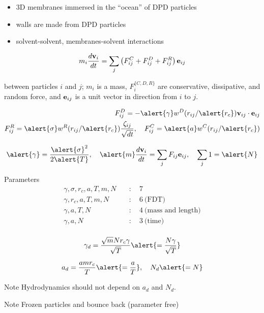 \begin{itemize}
  \item 3D membranes immersed in the ``ocean'' of DPD particles
  \item walls are made from DPD particles
  \item solvent-solvent, membranes-solvent interactions
\end{itemize}

\[
  m_i \frac{d \mathbf{v}_i}{dt} = \sum_{j}
  \left(
    F_{ij}^{C} + F_{ij}^{D} + F_{ij}^{R}
  \right) \mathbf{e}_{ij}{}
\]

between particles $i$ and $j$; $m_i$ is a mass, $F_{i}^{\{C,D,R\}}$
are conservative, dissipative, and random force, and $\mathbf{e}_{ij}{}$ is a unit
vector in direction from $i$ to $j$.
\eframe

\begin{align*}
  \label{eq:FD}
  F_{ij}^D = - \alert{\gamma} w^{D}(r_{ij}/\alert{r_{c}}) \mathbf{v}_{ij} \cdot \mathbf{e}_{ij} \\
  F_{ij}^R = \alert{\sigma} w^{R}(r_{ij}/\alert{r_{c}}) \frac{\zeta_{ij}}{\sqrt{dt}}, \quad
  F_{ij}^C = \alert{a} w^C(r_{ij}/\alert{r_{c}})
\end{align*}

\[
  \alert{\gamma} =\frac{\alert{\sigma}^2}{2\alert{T}},
  \quad \alert{m} \frac{d \mathbf{v}_{i}}{dt} = \sum_j F_{ij} \mathbf{e}_{ij},
  \quad
  \sum_j 1 = \alert{N}
\]

\begin{exampleblock}{Parameters}
\begin{align*}
    \gamma,           \sigma ,     r_c, a, T,    m,    N \quad &: \quad 7 \\
    \gamma,                        r_c, a ,T,    m,    N \quad &: \quad 6\ \text{(FDT)} \\
    \gamma,                             a, T,    N       \quad &: \quad 4\ \text{(mass and length)} \\
    \gamma,                             a,       N       \quad &: \quad 3\ \text{(time)} \\
\end{align*}
\end{exampleblock}
\eframe

\[
  \gamma_d = \frac{ \sqrt{m} N r_c \gamma}{ \sqrt{T} }
  \alert{ = \frac{ N \gamma}{ \sqrt{T} } }
\]

\[
   a_d     = \frac{a m r_c}{ T } \alert{ = \frac{a}{T} }, \quad
   N_d                          \alert{ = N}
\]

\begin{exampleblock}{Note}
Hydrodynamics should not depend on  $a_d$ and $N_d$.
\end{exampleblock}
\eframe


\bcc
 \bc  
  \begin{exampleblock}{Note}
    Frozen particles and bounce back (parameter free)
  \end{exampleblock}
 \ec

 \bc
 \ec
\ecc
\eframe
